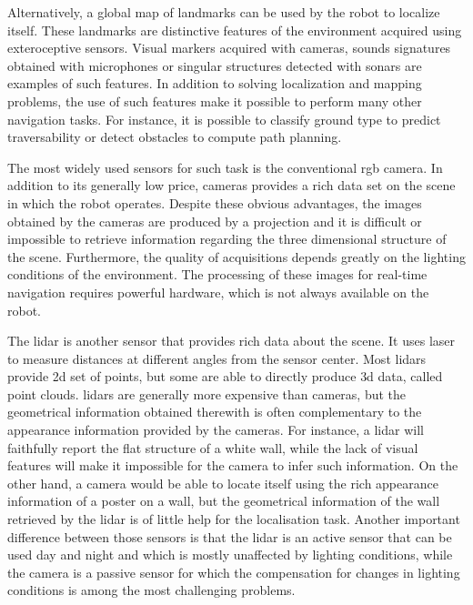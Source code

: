Alternatively, a global map of landmarks can be used by the robot to localize itself. These landmarks are distinctive features of the environment acquired using exteroceptive sensors. Visual markers acquired with cameras, sounds signatures obtained with microphones or singular structures detected with sonars are examples of such features. In addition to solving localization and mapping problems, the use of such features make it possible to perform many other navigation tasks. For instance, it is possible to classify ground type to predict traversability or detect obstacles to compute path planning.

The most widely used sensors for such task is the conventional \gls*{rgb} camera. In addition to its generally low price, cameras provides a rich data set on the scene in which the robot operates. Despite these obvious advantages, the images obtained by the cameras are produced by a projection and it is difficult or impossible to retrieve information regarding the three dimensional structure of the scene. Furthermore, the quality of acquisitions depends greatly on the lighting conditions of the environment. The processing of these images for real-time navigation requires powerful hardware, which is not always available on the robot.

The \gls*{lidar} is another sensor that provides rich data about the scene. It uses laser to measure distances at different angles from the sensor center. Most \gls*{lidar}s provide \gls*{2d} set of points, but some are able to directly produce \gls*{3d} data, called point clouds. \gls*{lidar}s are generally more expensive than cameras, but the geometrical information obtained therewith is often complementary to the appearance information provided by the cameras. For instance, a \gls*{lidar} will faithfully report the flat structure of a white wall, while the lack of visual features will make it impossible for the camera to infer such information. On the other hand, a camera would be able to locate itself using the rich appearance information of a poster on a wall, but the geometrical information of the wall retrieved by the \gls*{lidar} is of little help for the localisation task. Another important difference between those sensors is that the \gls*{lidar} is an active sensor that can be used day and night and which is mostly unaffected by lighting conditions, while the camera is a passive sensor for which the compensation for changes in lighting conditions is among the most challenging problems. 

